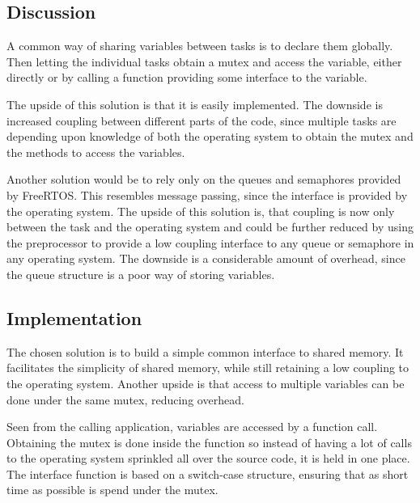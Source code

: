 \subsection{Discussion}
A common way of sharing variables between tasks is to declare them globally.
Then letting the individual tasks obtain a mutex and access the variable, either
directly or by calling a function providing some interface to the variable.

The upside of this solution is that it is easily implemented. The downside is
increased coupling between different parts of the code, since multiple tasks are
depending upon knowledge of both the operating system to obtain the mutex and
the methods to access the variables.

Another solution would be to rely only on the queues and semaphores provided by
FreeRTOS. This resembles message passing, since the interface is provided by the
operating system. The upside of this solution is, that coupling is now only
between the task and the operating system and could be further reduced by using
the preprocessor to provide a low coupling interface to any queue or semaphore
in any operating system. The downside is a considerable amount of overhead,
since the queue structure is a poor way of storing variables.

\subsection{Implementation}
The chosen solution is to build a simple common interface to shared memory. It
facilitates the simplicity of shared memory, while still retaining a low
coupling to the operating system. Another upside is that access to multiple
variables can be done under the same mutex, reducing overhead.

Seen from the calling application, variables are accessed by a function call.
Obtaining the mutex is done inside the function so instead of having a lot of
calls to the operating system sprinkled all over the source code, it is held in
one place. The interface function is based on a switch-case structure, ensuring
that as short time as possible is spend under the mutex.



